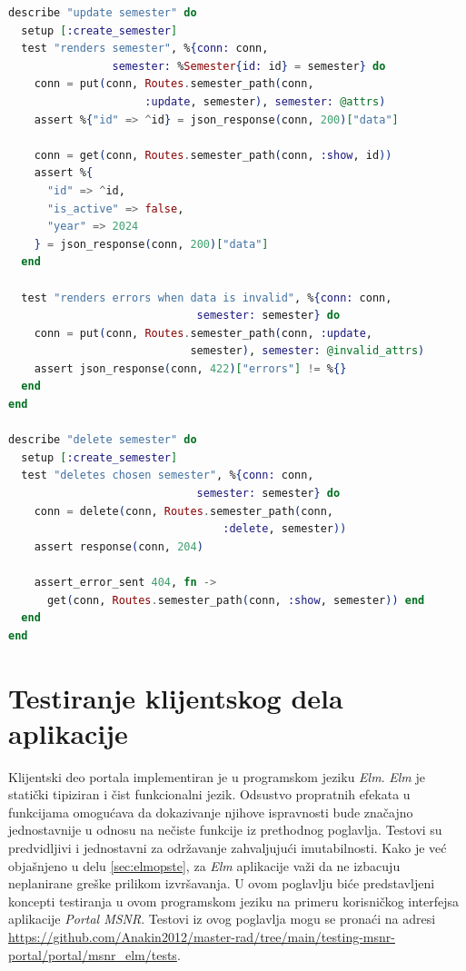 \documentclass[12pt,oneside]{memoir}
\begin{document}
\begin{minipage}{\linewidth}
\begin{lstlisting}[language=elixir, basicstyle=\small, caption={Testiranje akcija \emph{update} i \emph{delete} upravljača \emph{SemesterController}},captionpos=b, label={lst:updatedelete}]
describe "update semester" do
  setup [:create_semester]
  test "renders semester", %{conn: conn,
      			semester: %Semester{id: id} = semester} do
    conn = put(conn, Routes.semester_path(conn, 
                     :update, semester), semester: @attrs)
    assert %{"id" => ^id} = json_response(conn, 200)["data"]

    conn = get(conn, Routes.semester_path(conn, :show, id))
    assert %{
      "id" => ^id,
      "is_active" => false,
      "year" => 2024
    } = json_response(conn, 200)["data"]
  end

  test "renders errors when data is invalid", %{conn: conn,
                             semester: semester} do
    conn = put(conn, Routes.semester_path(conn, :update,
                            semester), semester: @invalid_attrs)
    assert json_response(conn, 422)["errors"] != %{}
  end
end

describe "delete semester" do
  setup [:create_semester]
  test "deletes chosen semester", %{conn: conn,
  			                 semester: semester} do
    conn = delete(conn, Routes.semester_path(conn,
      					         :delete, semester))
    assert response(conn, 204)

    assert_error_sent 404, fn ->
      get(conn, Routes.semester_path(conn, :show, semester)) end
  end
end
\end{lstlisting}
\end{minipage}


\chapter{Testiranje klijentskog dela aplikacije}
\label{chp:testiranjeelm}
\par Klijentski deo portala implementiran je u programskom jeziku \emph{Elm}. \emph{Elm} je statički tipiziran i čist funkcionalni jezik. Odsustvo propratnih efekata u funkcijama omogućava da dokazivanje njihove ispravnosti bude značajno jednostavnije u odnosu na nečiste funkcije iz prethodnog poglavlja. Testovi su predvidljivi i jednostavni za održavanje zahvaljujući imutabilnosti. Kako je već objašnjeno u delu \ref{sec:elmopste}, za \emph{Elm} aplikacije važi da ne izbacuju neplanirane greške prilikom izvršavanja. U ovom poglavlju biće predstavljeni koncepti testiranja u ovom programskom jeziku na primeru korisničkog interfejsa aplikacije \emph{Portal MSNR}. Testovi iz ovog poglavlja mogu se pronaći na adresi \url{https://github.com/Anakin2012/master-rad/tree/main/testing-msnr-portal/portal/msnr_elm/tests}.
\end{document}
